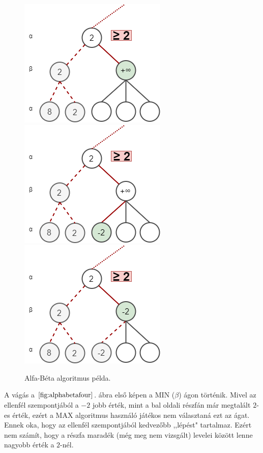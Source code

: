\documentclass[12pt,margin=0px]{article}
\begin{document}
{    \begin{figure}[H]
		\centering
        \includegraphics[width=0.32\linewidth]{img/alphabeta_05.png}
        \includegraphics[width=0.32\linewidth]{img/alphabeta_06.png}
        \includegraphics[width=0.32\linewidth]{img/alphabeta_07.png}
		\caption{Alfa-Béta algoritmus példa.}
		\label{fig:alphabetathree}
	\end{figure}

    \noindent A vágás a $\ref{fig:alphabetafour}$. ábra első képen a MIN ($\beta$) ágon történik. Mivel az ellenfél szempontjából a $-2$ jobb érték, mint a bal oldali részfán már megtalált $2$-es érték, ezért a MAX algoritmus használó játékos nem választaná ezt az ágat. Ennek oka, hogy az ellenfél szempontjából kedvezőbb ,,lépést" tartalmaz. Ezért nem számít, hogy a részfa maradék (még meg nem vizsgált) levelei között lenne nagyobb érték a $2$-nél.

}
\end{document}
